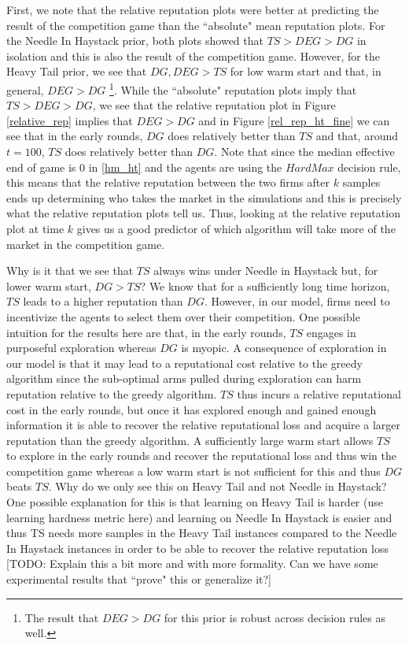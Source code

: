 \documentclass{article}
\theoremstyle{definition}
\begin{document}
First, we note that the relative reputation plots were better at predicting the result of the competition game than the ``absolute" mean reputation plots. For the Needle In Haystack prior, both plots showed that $TS > DEG > DG$ in isolation and this is also the result of the competition game. However, for the Heavy Tail prior, we see that $DG, DEG > TS$ for low warm start and that, in general, $DEG > DG$ \footnote{The result that $DEG > DG$ for this prior is robust across decision rules as well.}. While the ``absolute" reputation plots imply that $TS > DEG > DG$, we see that the relative reputation plot in Figure \ref{relative_rep} implies that $DEG > DG$ and in Figure \ref{rel_rep_ht_fine} we can see that in the early rounds, $DG$ does relatively better than $TS$ and that, around $t = 100$, $TS$ does relatively better than $DG$. Note that since the median effective end of game is $0$ in \ref{hm_ht} and the agents are using the $HardMax$ decision rule, this means that the relative reputation between the two firms after $k$ samples ends up determining who takes the market in the simulations and this is precisely what the relative reputation plots tell us. Thus, looking at the relative reputation plot at time $k$ gives us a good predictor of which algorithm will take more of the market in the competition game.

Why is it that we see that $TS$ always wins under Needle in Haystack but, for lower warm start, $DG > TS$? We know that for a sufficiently long time horizon, $TS$ leads to a higher reputation than $DG$. However, in our model, firms need to incentivize the agents to select them over their competition. One possible intuition for the results here are that, in the early rounds, $TS$ engages in purposeful exploration whereas $DG$ is myopic. A consequence of exploration in our model is that it may lead to a reputational cost relative to the greedy algorithm since the sub-optimal arms pulled during exploration can harm reputation relative to the greedy algorithm. $TS$ thus incurs a relative reputational cost in the early rounds, but once it has explored enough and gained enough information it is able to recover the relative reputational loss and acquire a larger reputation than the greedy algorithm. A sufficiently large warm start allows $TS$ to explore in the early rounds and recover the reputational loss and thus win the competition game whereas a low warm start is not sufficient for this and thus $DG$ beats $TS$. Why do we only see this on Heavy Tail and not Needle in Haystack? One possible explanation for this is that learning on Heavy Tail is harder (use learning hardness metric here) and learning on Needle In Haystack is easier and thus TS needs more samples in the Heavy Tail instances compared to the Needle In Haystack instances in order to be able to recover the relative reputation loss [TODO: Explain this a bit more and with more formality. Can we have some experimental results that ``prove" this or generalize it?]
\end{document}
